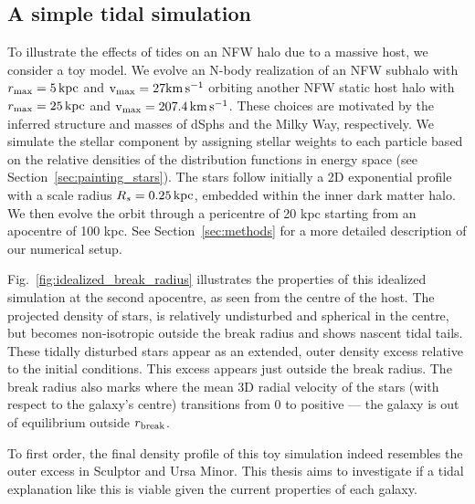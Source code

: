 \subsection{A simple tidal simulation}\label{a-simple-tidal-simulation}

To illustrate the effects of tides on an NFW halo due to a massive host,
we consider a toy model. We evolve an N-body realization of an NFW
subhalo with \(r_{\rm max}=5\,{\rm kpc}\) and \({\rm v}_{\rm max} = 27{\rm km\,s^{-1}}\) orbiting another
NFW static host halo with \(r_{\rm max}=25\,{\rm kpc}\) and
\({\rm v}_{\rm max} = 207.4\,{\rm km\,s^{-1}}\). These choices are motivated by the inferred
structure and masses of dSphs and the Milky Way, respectively. We
simulate the stellar component by assigning stellar weights to each
particle based on the relative densities of the distribution functions
in energy space (see Section~\ref{sec:painting_stars}). The stars follow
initially a 2D exponential profile with a scale radius
\(R_s=0.25\,{\rm kpc}\), embedded within the inner dark matter halo. We then
evolve the orbit through a pericentre of 20 kpc starting from an
apocentre of 100 kpc. See Section~\ref{sec:methods} for a more detailed
description of our numerical setup.

Fig.~\ref{fig:idealized_break_radius} illustrates the properties of this
idealized simulation at the second apocentre, as seen from the centre of
the host. The projected density of stars, is relatively undisturbed and
spherical in the centre, but becomes non-isotropic outside the break
radius and shows nascent tidal tails. These tidally disturbed stars
appear as an extended, outer density excess relative to the initial
conditions. This excess appears just outside the break radius. The break
radius also marks where the mean 3D radial velocity of the stars (with
respect to the galaxy's centre) transitions from 0 to positive --- the
galaxy is out of equilibrium outside \(r_{\rm break}\).

To first order, the final density profile of this toy simulation indeed
resembles the outer excess in Sculptor and Ursa Minor. This thesis aims
to investigate if a tidal explanation like this is viable given the
current properties of each galaxy.

